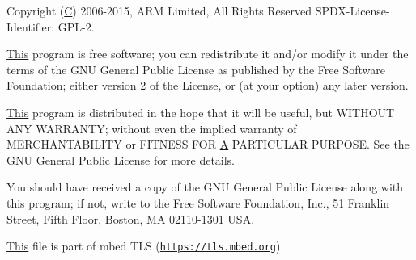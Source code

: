 Copyright (\hyperlink{struct_c}{C}) 2006-\/2015, A\+RM Limited, All Rights Reserved S\+P\+D\+X-\/\+License-\/\+Identifier\+: G\+P\+L-\/2.

\hyperlink{namespace_this}{This} program is free software; you can redistribute it and/or modify it under the terms of the G\+NU General Public License as published by the Free Software Foundation; either version 2 of the License, or (at your option) any later version.

\hyperlink{namespace_this}{This} program is distributed in the hope that it will be useful, but W\+I\+T\+H\+O\+UT A\+NY W\+A\+R\+R\+A\+N\+TY; without even the implied warranty of M\+E\+R\+C\+H\+A\+N\+T\+A\+B\+I\+L\+I\+TY or F\+I\+T\+N\+E\+SS F\+OR \hyperlink{struct_a}{A} P\+A\+R\+T\+I\+C\+U\+L\+AR P\+U\+R\+P\+O\+SE. See the G\+NU General Public License for more details.

You should have received a copy of the G\+NU General Public License along with this program; if not, write to the Free Software Foundation, Inc., 51 Franklin Street, Fifth Floor, Boston, MA 02110-\/1301 U\+SA.

\hyperlink{namespace_this}{This} file is part of mbed T\+LS (\href{https://tls.mbed.org}{\tt https\+://tls.\+mbed.\+org}) 